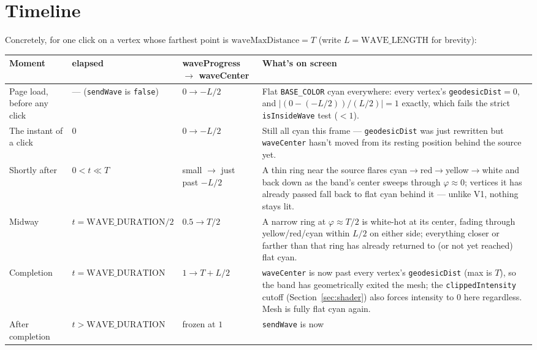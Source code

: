 \documentclass[11pt]{article}
\newcommand{\code}[1]{\texttt{#1}}
\begin{document}
\section{Timeline}
\label{sec:timeline}

Concretely, for one click on a vertex whose farthest point is
$\text{waveMaxDistance}=T$ (write $L=\text{WAVE\_LENGTH}$ for brevity):

\begin{center}
\small
\renewcommand{\arraystretch}{1.3}
\begin{tabular}{@{}p{2.5cm}p{1.7cm}p{3.0cm}p{6.1cm}@{}}
\toprule
\textbf{Moment} & \textbf{elapsed} & \textbf{waveProgress} $\to$ \textbf{waveCenter} &
  \textbf{What's on screen} \\
\midrule
Page load, before any click & --- (\code{sendWave} is \code{false}) & $0 \to -L/2$ &
  Flat \code{BASE\_COLOR} cyan everywhere: every vertex's \code{geodesicDist}$=0$, and
  $|(0-(-L/2))/(L/2)| = 1$ exactly, which fails the strict
  \code{isInsideWave} test ($<1$). \\
The instant of a click & $0$ & $0 \to -L/2$ & Still all cyan this frame ---
  \code{geodesicDist} was just rewritten but \code{waveCenter} hasn't moved from its
  resting position behind the source yet. \\
Shortly after & $0<t\ll T$ & small $\to$ just past $-L/2$ & A thin ring near the source
  flares cyan$\to$red$\to$yellow$\to$white and back down as the band's center sweeps
  through $\varphi\approx0$; vertices it has already passed fall back to flat cyan behind
  it --- unlike V1, nothing stays lit. \\
Midway & $t=\text{WAVE\_DURATION}/2$ & $0.5 \to T/2$ & A narrow ring at
  $\varphi\approx T/2$ is white-hot at its center, fading through yellow/red/cyan within
  $L/2$ on either side; everything closer or farther than that ring has already returned
  to (or not yet reached) flat cyan. \\
Completion & $t=\text{WAVE\_DURATION}$ & $1 \to T+L/2$ & \code{waveCenter} is now past
  every vertex's \code{geodesicDist} (max is $T$), so the band has geometrically exited the
  mesh; the \code{clippedIntensity} cutoff (Section~\ref{sec:shader}) also forces intensity
  to $0$ here regardless. Mesh is fully flat cyan again. \\
After completion & $t>\text{WAVE\_DURATION}$ & frozen at $1$ & \code{sendWave} is now

\end{tabular}
\end{center}
\end{document}
